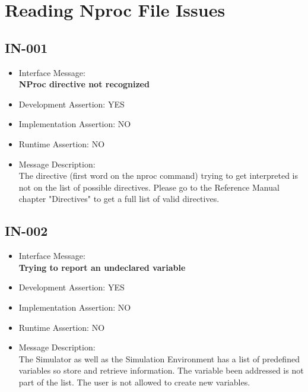 %
%

\section{Reading Nproc File Issues}

\subsection{IN-001}
\begin{itemize}
  \item Interface Message:\\[1em]\textbf{NProc directive not recognized}
  \item Development Assertion: YES
  \item Implementation Assertion: NO
  \item Runtime Assertion: NO
  \item Message Description:\\[1em]The directive (first word on the nproc command) trying to get interpreted is not on the list of possible directives. Please go to the Reference Manual chapter "Directives" to get a full list of valid directives.
\end{itemize}

\subsection{IN-002}
\begin{itemize}
  \item Interface Message:\\[1em]\textbf{Trying to report an undeclared variable}
  \item Development Assertion: YES
  \item Implementation Assertion: NO
  \item Runtime Assertion: NO
  \item Message Description:\\[1em]The Simulator as well as the Simulation Environment has a list of predefined variables so store and retrieve information. The variable been addressed is not part of the list. The user is not allowed to create new variables.
\end{itemize}

